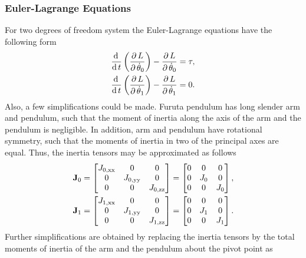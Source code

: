 \subsubsection{Euler-Lagrange Equations}
For two degrees of freedom system the Euler-Lagrange equations have the following form
\begin{subequations}\label{ELequation}
	\begin{align}
		\frac{\mathrm{d}\, }{\mathrm{d}\, t}\left( \frac{\partial\, L}{\partial\, \dot{\theta}_0} \right)-\frac{\partial\, L}{\partial\, \dot{\theta}_0} = \tau,\\
		\frac{\mathrm{d}\, }{\mathrm{d}\, t}\left( \frac{\partial\, L}{\partial\, \dot{\theta}_1} \right)-\frac{\partial\, L}{\partial\, \dot{\theta}_1} = 0.
	\end{align}
\end{subequations}
Also, a few simplifications could be made. Furuta pendulum has long slender arm and pendulum, such that the moment of inertia along the axis of the arm and the pendulum is negligible. In addition, arm and pendulum have rotational symmetry, such that the moments of inertia in two of the principal axes are equal. Thus, the inertia tensors may be approximated as follows
\begin{subequations}
	\begin{align}
	\text{\textbf{J}}_0 = 	\begin{bmatrix}
	J_{0,\text{xx}} & 0 & 0\\
	0 & J_{0,\text{yy}} & 0\\
	0 & 0 & J_{0,\text{zz}}\\
	\end{bmatrix} = \begin{bmatrix}
		0 & 0 & 0\\
	0 & J_0 & 0\\
	0 & 0 & J_0\\
	\end{bmatrix},\\
	\text{\textbf{J}}_1 = 	\begin{bmatrix}
	J_{1,\text{xx}} & 0 & 0\\
	0 & J_{1,\text{yy}} & 0\\
	0 & 0 & J_{1,\text{zz}}\\
	\end{bmatrix}= \begin{bmatrix}
	0 & 0 & 0\\
	0 & J_1 & 0\\
	0 & 0 & J_1\\
	\end{bmatrix}.
	\end{align}
\end{subequations}
Further simplifications are obtained by replacing the inertia tensors by the total moments of inertia of the arm and the pendulum about the pivot point as
